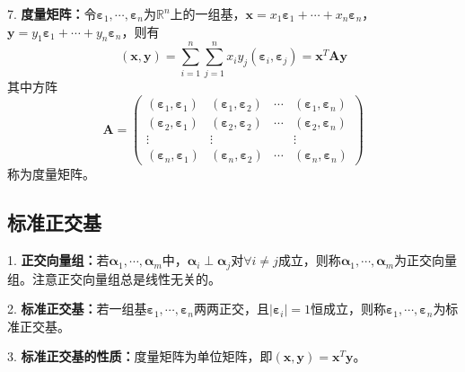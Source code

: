 7. \textbf{度量矩阵：}令$\boldsymbol{\varepsilon}_1,\cdots,\boldsymbol{\varepsilon}_n$为$\mathbb{R}^n$上的一组基，$\boldsymbol{x}=x_1\boldsymbol{\varepsilon}_1+\cdots+x_n\boldsymbol{\varepsilon}_n$，$\boldsymbol{y}=y_1\boldsymbol{\varepsilon}_1+\cdots+y_n\boldsymbol{\varepsilon}_n$，则有
\begin{equation*}
    (\boldsymbol{x},\boldsymbol{y})=\sum\limits_{i=1}^n \sum\limits_{j=1}^n x_iy_j(\boldsymbol{\varepsilon}_i,\boldsymbol{\varepsilon}_j)=\boldsymbol{x}^T\boldsymbol{A}\boldsymbol{y}
\end{equation*}
其中方阵
\begin{equation*}
    \boldsymbol{A}=\begin{pmatrix}
        (\boldsymbol{\varepsilon}_1,\boldsymbol{\varepsilon}_1)&(\boldsymbol{\varepsilon}_1,\boldsymbol{\varepsilon}_2)&\cdots&(\boldsymbol{\varepsilon}_1,\boldsymbol{\varepsilon}_n)\\
        (\boldsymbol{\varepsilon}_2,\boldsymbol{\varepsilon}_1)&(\boldsymbol{\varepsilon}_2,\boldsymbol{\varepsilon}_2)&\cdots&(\boldsymbol{\varepsilon}_2,\boldsymbol{\varepsilon}_n)\\
        \vdots&\vdots&&\vdots\\
        (\boldsymbol{\varepsilon}_n,\boldsymbol{\varepsilon}_1)&(\boldsymbol{\varepsilon}_n,\boldsymbol{\varepsilon}_2)&\cdots&(\boldsymbol{\varepsilon}_n,\boldsymbol{\varepsilon}_n)
    \end{pmatrix}
\end{equation*}
称为度量矩阵。

\subsection{标准正交基}

1. \textbf{正交向量组：}若$\boldsymbol{\alpha}_1,\cdots,\boldsymbol{\alpha}_m$中，$\boldsymbol{\alpha}_i\perp \boldsymbol{\alpha}_j$对$\forall i \neq j$成立，则称$\boldsymbol{\alpha}_1,\cdots,\boldsymbol{\alpha}_m$为正交向量组。注意正交向量组总是线性无关的。

2. \textbf{标准正交基：}若一组基$\boldsymbol{\varepsilon}_1,\cdots,\boldsymbol{\varepsilon}_n$两两正交，且$|\boldsymbol{\varepsilon}_i|=1$恒成立，则称$\boldsymbol{\varepsilon}_1,\cdots,\boldsymbol{\varepsilon}_n$为标准正交基。

3. \textbf{标准正交基的性质：}度量矩阵为单位矩阵，即$(\boldsymbol{x},\boldsymbol{y})=\boldsymbol{x}^T\boldsymbol{y}$。

